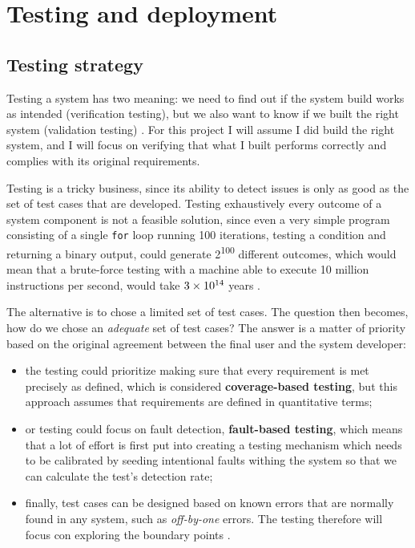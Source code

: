 \chapter{Testing and deployment}

\section{Testing strategy}
Testing a system has two meaning: we need to find out if the system build works
as intended (verification testing), but we also want to know if we built the
right system (validation testing) \cite{VV08}. For this project I will assume
I did build the right system, and I will focus on verifying that what I built
performs correctly and complies with its original requirements.

Testing is a tricky business, since its ability to detect issues is only as
good as the set of test cases that are developed. Testing exhaustively every
outcome of a system component is not a feasible solution, since even a very
simple program consisting of a single \texttt{for} loop running 100 iterations,
testing a condition and returning a binary output, could generate
2\textsuperscript{100} different outcomes, which would mean that a brute-force
testing with a machine able to execute 10 million instructions per second, would
take $3 \times 10\textsuperscript{14}$ years \cite{VV08}.

The alternative is to chose a limited set of test cases. The question then
becomes, how do we chose an \emph{adequate} set of test cases? The answer is a
matter of priority based on the original agreement between the final user and the
system developer:
\begin{itemize}
  \item the testing could prioritize making sure that every requirement is met
  precisely as defined, which is considered \textbf{coverage-based testing}, but
  this approach assumes that requirements are defined in quantitative terms;
  \item or testing could focus on fault detection, \textbf{fault-based testing},
  which means that a lot of effort is first put into creating a testing
  mechanism which needs to be calibrated by seeding intentional faults withing
  the system so that we can calculate the test's detection rate;
  \item finally, test cases can be designed based on known errors
  that are normally found in any system, such as \emph{off-by-one} errors. The
  testing therefore will focus con exploring the boundary points \cite{VV08}.
\end{itemize}

